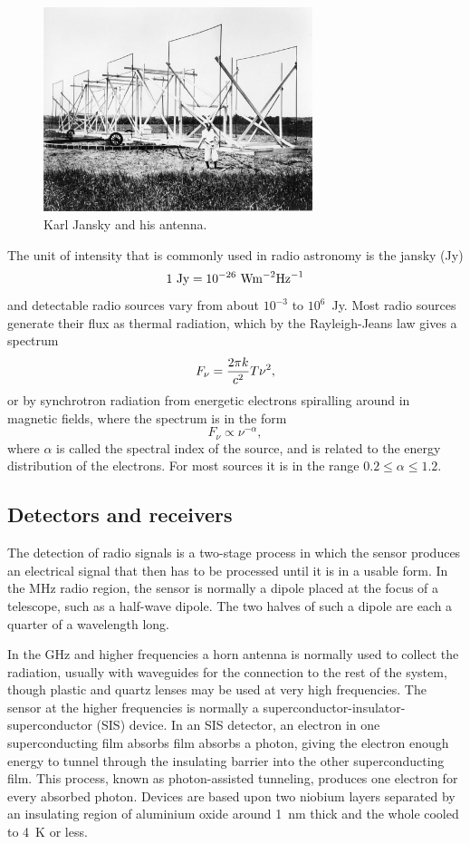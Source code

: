 \begin{figure}[h]
  \centering
	\includegraphics[width=0.7\textwidth]{jansky-antenna.eps}
  \caption{Karl Jansky and his antenna.}
  \label{fig:jansky-antenna}
\end{figure}

The unit of intensity that is commonly used in radio astronomy is the 
jansky (Jy)
\[
1~{\rm Jy}=10^{-26}~{\rm W m}^{-2}{\rm Hz}^{-1}
\]
and detectable radio sources vary from about $10^{-3}$ to $10^6$~Jy. Most
radio sources generate their flux as thermal radiation, which by the 
Rayleigh-Jeans law gives a spectrum
\[
F_\nu={2\pi k\over c^2}T\nu^2,
\]
or by synchrotron radiation from energetic electrons spiralling around
in magnetic fields, where the spectrum is in the form
\[
F_\nu\propto\nu^{-\alpha},
\]
where $\alpha$ is called the spectral index of the source, and is related
to the energy distribution of the electrons. For most sources it is in the
range $0.2\le \alpha\le 1.2$.

\subsection{Detectors and receivers}

The detection of radio signals is a two-stage process in which the sensor
produces an electrical signal that then has to be processed until it is in
a usable form. In the MHz radio region, the sensor is normally a dipole 
placed at the focus of a telescope, such as a half-wave dipole. The two halves
of such a dipole are each a quarter of a wavelength long. 

In the GHz and higher frequencies a horn antenna is normally used to collect 
the radiation, usually with waveguides for the connection to the rest of the 
system, though plastic and quartz lenses may be used at very high frequencies.
The sensor at the higher frequencies is normally a 
superconductor-insulator-superconductor (SIS) device. In an SIS detector, an
electron in one superconducting film absorbs film absorbs a photon, giving the
electron enough energy to tunnel through the insulating barrier into the other
superconducting film. This process, known as photon-assisted tunneling, 
produces one electron for every absorbed photon. Devices are based upon two
niobium layers separated by an insulating region of aluminium oxide around
1~nm thick and the whole cooled to 4~K or less.

